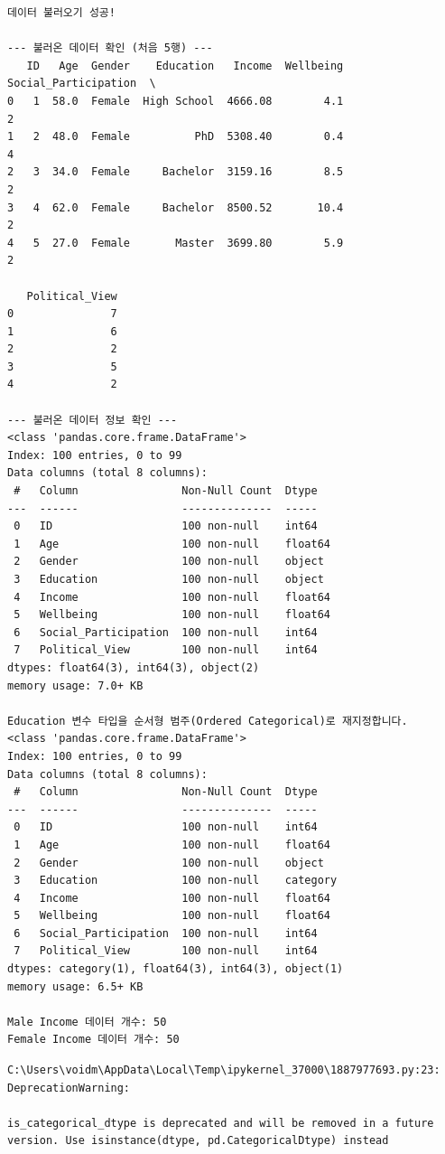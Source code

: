 \documentclass[
  letterpaper,
]{book}
\begin{document}
\begin{verbatim}
데이터 불러오기 성공!

--- 불러온 데이터 확인 (처음 5행) ---
   ID   Age  Gender    Education   Income  Wellbeing  Social_Participation  \
0   1  58.0  Female  High School  4666.08        4.1                     2   
1   2  48.0  Female          PhD  5308.40        0.4                     4   
2   3  34.0  Female     Bachelor  3159.16        8.5                     2   
3   4  62.0  Female     Bachelor  8500.52       10.4                     2   
4   5  27.0  Female       Master  3699.80        5.9                     2   

   Political_View  
0               7  
1               6  
2               2  
3               5  
4               2  

--- 불러온 데이터 정보 확인 ---
<class 'pandas.core.frame.DataFrame'>
Index: 100 entries, 0 to 99
Data columns (total 8 columns):
 #   Column                Non-Null Count  Dtype  
---  ------                --------------  -----  
 0   ID                    100 non-null    int64  
 1   Age                   100 non-null    float64
 2   Gender                100 non-null    object 
 3   Education             100 non-null    object 
 4   Income                100 non-null    float64
 5   Wellbeing             100 non-null    float64
 6   Social_Participation  100 non-null    int64  
 7   Political_View        100 non-null    int64  
dtypes: float64(3), int64(3), object(2)
memory usage: 7.0+ KB

Education 변수 타입을 순서형 범주(Ordered Categorical)로 재지정합니다.
<class 'pandas.core.frame.DataFrame'>
Index: 100 entries, 0 to 99
Data columns (total 8 columns):
 #   Column                Non-Null Count  Dtype   
---  ------                --------------  -----   
 0   ID                    100 non-null    int64   
 1   Age                   100 non-null    float64 
 2   Gender                100 non-null    object  
 3   Education             100 non-null    category
 4   Income                100 non-null    float64 
 5   Wellbeing             100 non-null    float64 
 6   Social_Participation  100 non-null    int64   
 7   Political_View        100 non-null    int64   
dtypes: category(1), float64(3), int64(3), object(1)
memory usage: 6.5+ KB

Male Income 데이터 개수: 50
Female Income 데이터 개수: 50
\end{verbatim}

\begin{verbatim}
C:\Users\voidm\AppData\Local\Temp\ipykernel_37000\1887977693.py:23: DeprecationWarning:

is_categorical_dtype is deprecated and will be removed in a future version. Use isinstance(dtype, pd.CategoricalDtype) instead
\end{verbatim}
\end{document}
